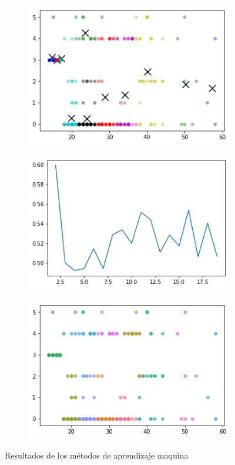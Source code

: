 \documentclass[5p,times]{elsarticle}
\begin{document}
\begin{figure}[H]
\centering
\begin{subfigure}[t]{0.2375\textwidth}
\includegraphics[width=\textwidth]{15}
\caption{}
\end{subfigure}
\hfill
\begin{subfigure}[t]{0.2375\textwidth}
\includegraphics[width=\textwidth]{16}
\caption{}
\end{subfigure}
\hfill
\begin{subfigure}[t]{0.2375\textwidth}
\includegraphics[width=\textwidth]{17}
\caption{}
\end{subfigure}\caption{Resultados de los métodos de aprendizaje maquina}\label{fig:MachineLearningG}
\end{figure}
\end{document}
